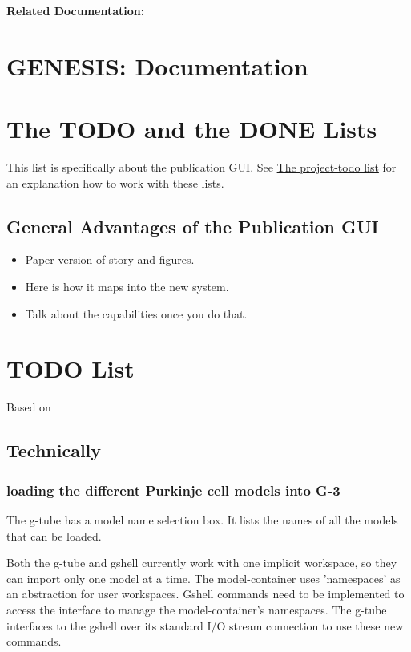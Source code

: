 \documentclass[12pt]{article}
\begin{document}
{\bf Related Documentation:}

\section*{GENESIS: Documentation}

\section{The TODO and the DONE Lists}

This list is specifically about the publication GUI.  See
\href{../project-todo/project-todo.tex}{The project-todo list} for an
explanation how to work with these lists.

\subsection{General Advantages of the Publication GUI}
\begin{itemize}
\item Paper version of story and figures.
\item Here is how it maps into the new system.
\item Talk about the capabilities once you do that.
\end{itemize}


\section{TODO List}

Based on
\cite{deschutter94:_purkin_i}\cite{deschutter94:_purkin_ii}\cite{schutter94:_simul_purkin}

\subsection{Technically}

\subsubsection{loading the different Purkinje cell models into G-3}

The g-tube has a model name selection box.  It lists the names of all
the models that can be loaded.

Both the g-tube and gshell currently work with one implicit workspace,
so they can import only one model at a time.  The model-container uses
'namespaces' as an abstraction for user workspaces.  Gshell commands
need to be implemented to access the interface to manage the
model-container's namespaces.  The g-tube interfaces to the gshell
over its standard I/O stream connection to use these new commands.
\end{document}
